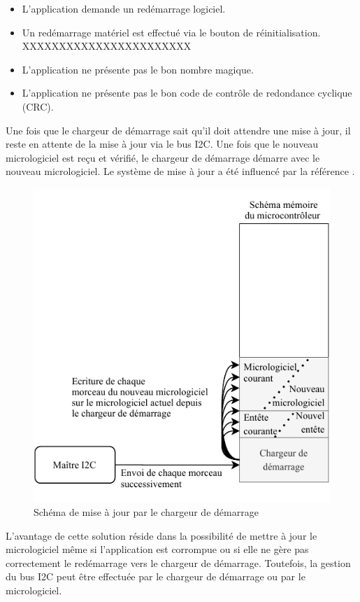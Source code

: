 \begin{itemize}
    \item L'application demande un redémarrage logiciel.
    \item Un redémarrage matériel est effectué via le bouton de réinitialisation. XXXXXXXXXXXXXXXXXXXXXXX
    \item L'application ne présente pas le bon nombre magique.
    \item L'application ne présente pas le bon code de contrôle de redondance cyclique (CRC).
\end{itemize}

Une fois que le chargeur de démarrage sait qu'il doit attendre une mise à jour, il reste en attente de la mise à jour via le bus I2C.
Une fois que le nouveau micrologiciel est reçu et vérifié, le chargeur de démarrage démarre avec le nouveau micrologiciel.
Le système de mise à jour a été influencé par la référence \cite{reindl2020software}.

\begin{figure}[H]
    \centering
    \includegraphics[scale=1.3]{./assets/figures/bootloader_update.pdf}
    \caption{Schéma de mise à jour par le chargeur de démarrage}
\end{figure}

L'avantage de cette solution réside dans la possibilité de mettre à jour le micrologiciel même si l'application est corrompue ou si elle ne gère pas correctement le redémarrage vers le chargeur de démarrage.
Toutefois, la gestion du bus I2C peut être effectuée par le chargeur de démarrage ou par le micrologiciel.

